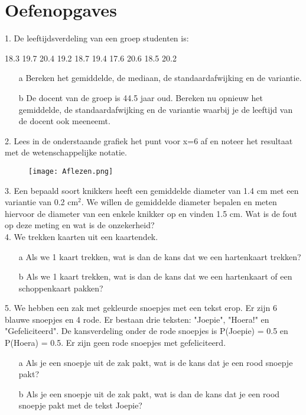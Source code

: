 \section{Oefenopgaves}
\label{/tussentoets-i/oefenopgaves}

1. De leeftijdsverdeling van een groep studenten is:\\

\begin{center}18.3 19.7 20.4 19.2 18.7 19.4 17.6 20.6 18.5 20.2\end{center}
\begin{itemize}
\item[a]  Bereken het gemiddelde, de mediaan, de standaardafwijking en de variantie.
\item[b] De docent van de groep is 44.5 jaar oud.  
Bereken nu opnieuw het gemiddelde, de standaardafwijking en de variantie waarbij je de leeftijd van de docent ook meeneemt. \\
\end{itemize}


2. Lees in de onderstaande grafiek het punt voor x=6 af en noteer het resultaat met de wetenschappelijke notatie. 

\begin{figure}[h!]
\centering
\texttt{[image: Aflezen.png]}
\label{fig:Aflezen}
\end{figure}


3. Een bepaald soort knikkers heeft een gemiddelde diameter van 1.4 cm met een variantie van 0.2 cm$^2$. We willen de gemiddelde diameter bepalen en meten hiervoor de diameter van een enkele knikker op en vinden 1.5 cm. Wat is de fout op deze meting en wat is de onzekerheid? \\


4. We trekken kaarten uit een kaartendek.
\begin{itemize}
\item[a] Als we 1 kaart trekken, wat is dan de kans dat we een hartenkaart trekken?
\item[b] Als we 1 kaart trekken, wat is dan de kans dat we een hartenkaart of een schoppenkaart pakken?
\end{itemize}


5. We hebben een zak met gekleurde snoepjes met een tekst erop. Er zijn 6 blauwe snoepjes en 4 rode. Er bestaan drie teksten: "Joepie", "Hoera!" en "Gefeliciteerd". De kansverdeling onder de rode snoepjes is P(Joepie) = 0.5 en P(Hoera) = 0.5. Er zijn geen rode snoepjes met gefeliciteerd. 
\begin{itemize}
\item[a] Als je een snoepje uit de zak pakt, wat is de kans dat je een rood snoepje pakt?
\item[b] Als je een snoepje uit de zak pakt, wat is dan de kans dat je een rood snoepje pakt met de tekst Joepie?
\end{itemize}


